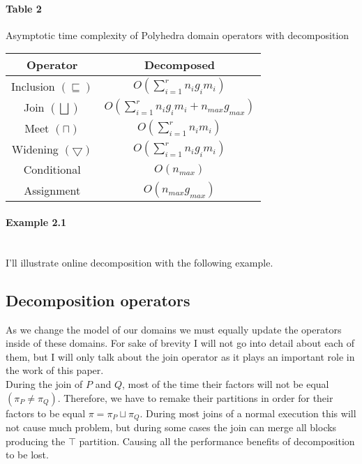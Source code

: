 \paragraph{Table 2} Asymptotic time complexity of Polyhedra domain operators with decomposition

\begin{center}
\begin{tabular}{||c c||} 
 
 \hline
 Operator & Decomposed  \\ [0.5ex] 
 \hline
 Inclusion $(\sqsubseteq)$ & $O(\sum_{i=1}^r n_ig_im_i)$\\ 
 \hline
 Join $(\bigsqcup)$ & $O(\sum_{i=1}^r n_i g_i m_i + n_{max} g_{max})$ \\
 \hline
 Meet $(\sqcap)$ & $O(\sum_{i=1}^r n_i m_i)$ \\
 \hline
 Widening $(\bigtriangledown)$ & $O(\sum_{i=1}^r n_i g_i m_i)$\\
 \hline
 Conditional & $O(n_{max})$ \\ 
 \hline
 Assignment & $O(n_{max}g_{max})$ \\ 
 
 
 \hline
\end{tabular}
\end{center}

 
\paragraph{Example 2.1} \mbox{}\\
I'll illustrate online decomposition with the following example.


\subsection{Decomposition operators}
As we change the model of our domains we must equally update the operators inside of these domains. For sake of brevity I will not go into detail about each of them, but I will only talk about the join operator as it plays an important role in the work of this paper.\\
During the join of $P$ and $Q$, most of the time their factors will not be equal$(\pi_P \neq \pi_Q)$. Therefore, we have to remake their partitions in order for their factors to be equal $\pi = \pi_P\sqcup\pi_Q$. During most joins of a normal execution this will not cause much problem, but during some cases the join can merge all blocks producing the $\top$ partition. Causing all the performance benefits of decomposition to be lost.
